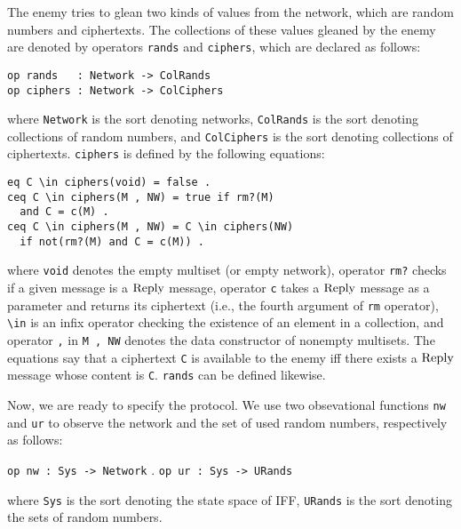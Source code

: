 \documentclass[10pt, conference, compsocconf]{IEEEtran}
\begin{document}
The enemy tries to glean two kinds of values from the network, which are random numbers and ciphertexts. The collections of these values gleaned by the enemy are denoted by operators \verb!rands! and \verb!ciphers!, which are declared as follows:

\begin{small}
	\begin{verbatim}
op rands   : Network -> ColRands
op ciphers : Network -> ColCiphers
	\end{verbatim}
\end{small}

\noindent
where \verb!Network! is the sort denoting networks, \verb!ColRands! is the sort denoting collections of random numbers, and \verb!ColCiphers! is the sort denoting collections of ciphertexts. 
\verb!ciphers! is defined by the following equations:

\begin{small}
	\begin{verbatim}
eq C \in ciphers(void) = false .
ceq C \in ciphers(M , NW) = true if rm?(M)
  and C = c(M) .
ceq C \in ciphers(M , NW) = C \in ciphers(NW) 
  if not(rm?(M) and C = c(M)) .
	\end{verbatim}
\end{small}

\noindent
where \verb!void! denotes the empty multiset (or empty network),
operator \verb!rm?! checks if a given message is a $\rm Reply$ message,
operator \verb!c! takes a $\rm Reply$ message as a parameter and returns its ciphertext (i.e., the fourth argument of \verb!rm! operator),
\verb!\in! is an infix operator checking the existence of an element in a collection,
and operator \verb!,! in \verb!M , NW! denotes the data constructor of nonempty multisets. 
The equations say that a ciphertext \verb!C! is available to the enemy iff there exists a $\rm Reply$ message whose content is \verb!C!. \verb!rands! can be defined likewise.

Now, we are ready to specify the protocol. We use two obsevational functions \verb!nw! and \verb!ur! to observe the network and the set of used random numbers, respectively as follows:

\smallskip
\begin{small}
\noindent
\verb!op nw : Sys -> Network! . \verb!op ur : Sys -> URands!
\end{small}
\smallskip

\noindent
where \verb!Sys! is the sort denoting the state space of IFF, \verb!URands! is the sort denoting the sets of random numbers.
\end{document}
